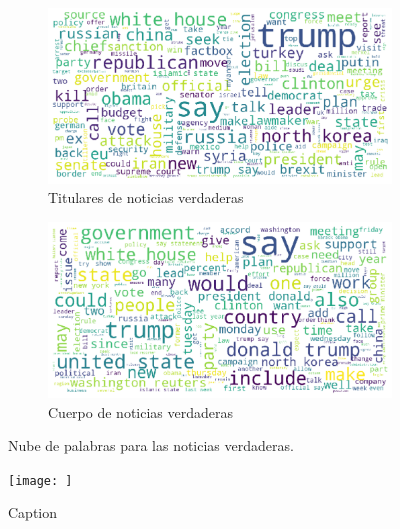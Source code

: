{\begin{figure}
\centering
\begin{subfigure}{\escala\textwidth}
    \centering
    \includegraphics[width=\textwidth]{imagenes/wordcloud_titulares_verdaderas.pdf}
    \caption{Titulares de noticias verdaderas}
    \label{fig:tit-true}
\end{subfigure}%
\newline
\begin{subfigure}{\escala\textwidth}
    \centering
    \includegraphics[width=\textwidth]{imagenes/wordclouds_cuerpo_verdaderas.pdf}
    \caption{Cuerpo de noticias verdaderas}
    \label{fig:text-true}
\end{subfigure}
\caption{Nube de palabras para las noticias verdaderas.}
\label{fig:fake}
\end{figure}

\begin{figure}
    \centering
    \texttt{[image: ]}
    \caption{Caption}
    \label{fig:my_label}
\end{figure}

}

